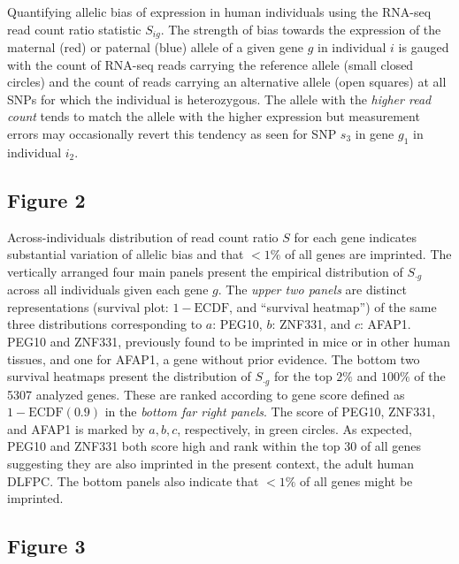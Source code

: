 \documentclass[letterpaper]{article}
\begin{document}
Quantifying allelic bias of expression in human
individuals using the RNA-seq read count ratio statistic \(S_{ig}\).
The strength of
bias towards the expression of the maternal (red) or paternal (blue) allele of
a given gene \(g\) in individual \(i\) is gauged with the count of RNA-seq
reads carrying the reference allele (small closed circles) and the count of
reads carrying an alternative allele (open squares) at all SNPs for which the
individual is heterozygous.  The allele with the \emph{higher read count} tends to
match the allele with the higher expression but measurement errors may
occasionally revert this tendency as seen for SNP \(s_3\) in gene \(g_1\) in
individual \(i_2\).


\subsection*{Figure 2}

Across-individuals distribution of read count ratio \(S\) for each
gene indicates substantial variation of allelic bias and that \(<1\%\) of all
genes are imprinted.  The vertically arranged
four main panels present the empirical distribution of \(S_{\cdot g}\) across all
individuals given each gene \(g\).  The \emph{upper two panels} are distinct
representations (survival plot: \(1 - \mathrm{ECDF}\), and
``survival heatmap'') of the same three distributions corresponding to \(a\):
PEG10, \(b\): ZNF331, and \(c\): AFAP1.  PEG10 and ZNF331,
previously found to be imprinted in mice or in other human tissues, and one
for AFAP1, a gene without prior evidence.  The bottom two survival heatmaps present
the distribution of \(S_{\cdot g}\) for the top \(2\%\) and \(100\%\) of the
5307 analyzed genes.  These are ranked according to gene score defined as \(1
- \mathrm{ECDF}(0.9)\) in the \emph{bottom
far right panels}.  The score of PEG10, ZNF331, and AFAP1 is marked by
\(a,b,c\), respectively, in green circles.  As expected, PEG10 and ZNF331 both score
high and rank within the top 30 of all genes suggesting they are also imprinted in
the present context, the adult human DLFPC.  The bottom panels also indicate
that \(<1\%\) of all genes might be imprinted.

\subsection*{Figure 3}
\end{document}
